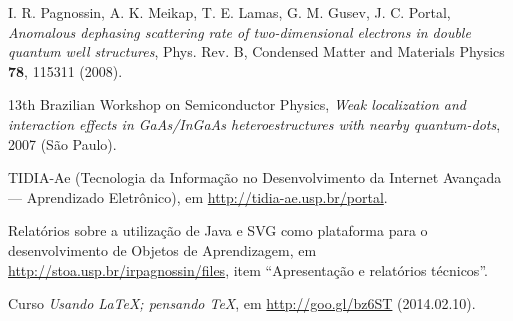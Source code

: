 \begin{thebibliography}{+++}
	 I. R. Pagnossin, A. K. Meikap, T. E. Lamas, G. M. Gusev, J. C. Portal, \textsl{Anomalous dephasing scattering rate of two-dimensional electrons in double quantum well structures}, Phys. Rev. B, Condensed Matter and Materials Physics \textbf{78}, 115311 (2008). 
	
	 13th Brazilian Workshop on Semiconductor Physics, \textsl{Weak localization and interaction effects in GaAs/InGaAs heteroestructures with nearby quantum-dots}, 2007 (São Paulo).
	
	 TIDIA-Ae (Tecnologia da Informação no Desenvolvimento da Internet Avançada --- Aprendizado Eletrônico), em \url{http://tidia-ae.usp.br/portal}.
	
	 Relatórios sobre a utilização de Java e SVG como plataforma para o desenvolvimento de Objetos de Aprendizagem, em \url{http://stoa.usp.br/irpagnossin/files}, item ``Apresentação e relatórios técnicos''.
	
	 Curso \textsl{Usando \LaTeX; pensando \TeX}, em \url{http://goo.gl/bz6ST} (2014.02.10).
\end{thebibliography}